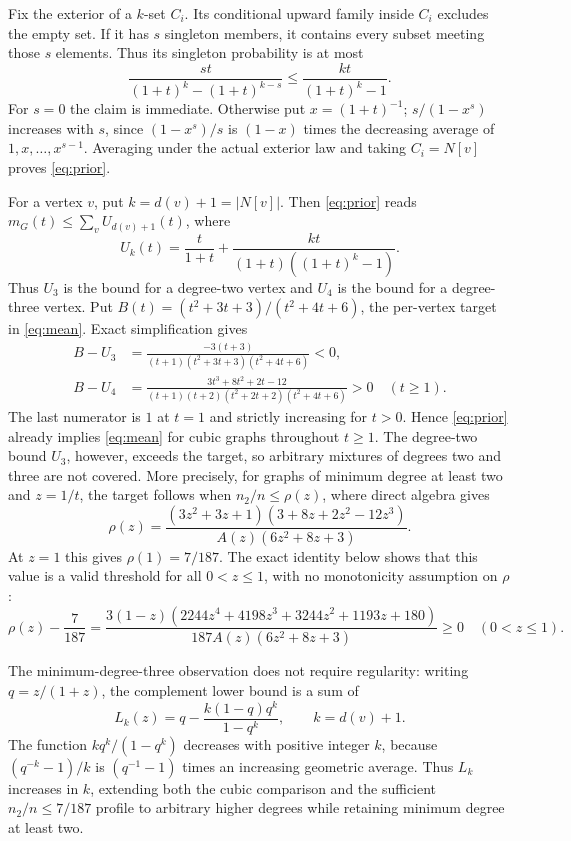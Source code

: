 \documentclass[11pt]{article}
\begin{document}
Fix the exterior of a $k$-set $C_i$. Its conditional upward family inside $C_i$ excludes the empty set. If it has $s$ singleton members, it contains every subset meeting those $s$ elements. Thus its singleton probability is at most
\[
 \frac{st}{(1+t)^k-(1+t)^{k-s}}
 \le\frac{kt}{(1+t)^k-1}.
\]
For $s=0$ the claim is immediate. Otherwise put $x=(1+t)^{-1}$; $s/(1-x^s)$ increases with $s$, since $(1-x^s)/s$ is $(1-x)$ times the decreasing average of $1,x,\ldots,x^{s-1}$. Averaging under the actual exterior law and taking $C_i=N[v]$ proves \eqref{eq:prior}.

For a vertex $v$, put $k=d(v)+1=|N[v]|$. Then \eqref{eq:prior} reads $m_G(t)\le\sum_vU_{d(v)+1}(t)$, where
\[
 U_k(t)=\frac t{1+t}+\frac{kt}{(1+t)((1+t)^k-1)}.
\]
Thus $U_3$ is the bound for a degree-two vertex and $U_4$ is the bound for a degree-three vertex. Put $B(t)=(t^2+3t+3)/(t^2+4t+6)$, the per-vertex target in \eqref{eq:mean}. Exact simplification gives
\begin{align*}
 B-U_3&=\frac{-3(t+3)}{(t+1)(t^2+3t+3)(t^2+4t+6)}<0,\\
 B-U_4&=\frac{3t^3+8t^2+2t-12}{(t+1)(t+2)(t^2+2t+2)(t^2+4t+6)}>0
 \quad(t\ge1).
\end{align*}
The last numerator is $1$ at $t=1$ and strictly increasing for $t>0$. Hence \eqref{eq:prior} already implies \eqref{eq:mean} for cubic graphs throughout $t\ge1$. The degree-two bound $U_3$, however, exceeds the target, so arbitrary mixtures of degrees two and three are not covered. More precisely, for graphs of minimum degree at least two and $z=1/t$, the target follows when $n_2/n\le\rho(z)$, where direct algebra gives
\[
 \rho(z)=\frac{(3z^2+3z+1)(3+8z+2z^2-12z^3)}{A(z)(6z^2+8z+3)}.
\]
At $z=1$ this gives $\rho(1)=7/187$. The exact identity below shows that this value is a valid threshold for all $0<z\le1$, with no monotonicity assumption on $\rho$:
\[
 \rho(z)-\frac7{187}=\frac{3(1-z)(2244z^4+4198z^3+3244z^2+1193z+180)}{187A(z)(6z^2+8z+3)}\ge0
 \quad(0<z\le1).
\]

The minimum-degree-three observation does not require regularity: writing $q=z/(1+z)$, the complement lower bound is a sum of
\[
 L_k(z)=q-\frac{k(1-q)q^k}{1-q^k},\qquad k=d(v)+1.
\]
The function $kq^k/(1-q^k)$ decreases with positive integer $k$, because $(q^{-k}-1)/k$ is $(q^{-1}-1)$ times an increasing geometric average. Thus $L_k$ increases in $k$, extending both the cubic comparison and the sufficient $n_2/n\le7/187$ profile to arbitrary higher degrees while retaining minimum degree at least two. 
\end{document}
